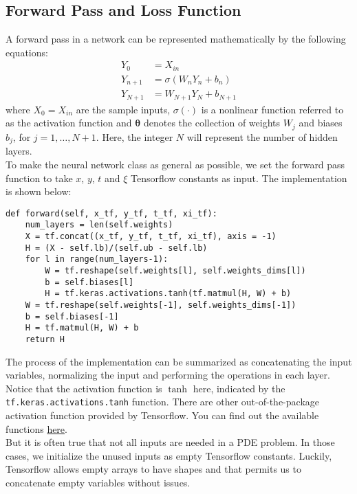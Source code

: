 \documentclass{article}
\newcommand{\btheta}{\bm{\theta}}
\begin{document}
\subsection{Forward Pass and Loss Function}
A forward pass in a network can be represented mathematically by the following equations:
\begin{equation}
\begin{split}
Y_0 &= X_{in}\\
Y_{n+1} &= \sigma(W_nY_n+b_n)\\
Y_{N+1} &= W_{N+1}Y_{N}+b_{N+1}
\end{split}
\label{eq:nn}
\end{equation}
where $X_0 = X_{in}$ are the sample inputs, $\sigma(\cdot)$ is a nonlinear function referred to as the activation function and $\btheta$ denotes the collection of weights $W_{j}$ and biases $b_j$, for $j = 1,\dots, N+1$. Here, the integer $N$ will represent the number of hidden layers. \\

To make the neural network class as general as possible, we set the forward pass function to take $x$, $y$, $t$ and $\xi$ Tensorflow constants as input. The implementation is shown below:
\begin{lstlisting}
def forward(self, x_tf, y_tf, t_tf, xi_tf):
	num_layers = len(self.weights) 
	X = tf.concat((x_tf, y_tf, t_tf, xi_tf), axis = -1)
	H = (X - self.lb)/(self.ub - self.lb)
	for l in range(num_layers-1):
		W = tf.reshape(self.weights[l], self.weights_dims[l])
		b = self.biases[l]
		H = tf.keras.activations.tanh(tf.matmul(H, W) + b)	
	W = tf.reshape(self.weights[-1], self.weights_dims[-1])
	b = self.biases[-1]
	H = tf.matmul(H, W) + b
	return H
\end{lstlisting}
The process of the implementation can be summarized as concatenating the input variables, normalizing the input and performing the operations in each layer. Notice that the activation function is $\tanh$ here, indicated by the \texttt{tf.keras.activations.tanh} function. There are other out-of-the-package activation function provided by Tensorflow. You can find out the available functions \href{https://www.tensorflow.org/api_docs/python/tf/keras/activations}{here}. \\

But it is often true that not all inputs are needed in a PDE problem. In those cases, we initialize the unused inputs as empty Tensorflow constants. Luckily, Tensorflow allows empty arrays to have shapes and that permits us to concatenate empty variables without issues.\\
\end{document}
